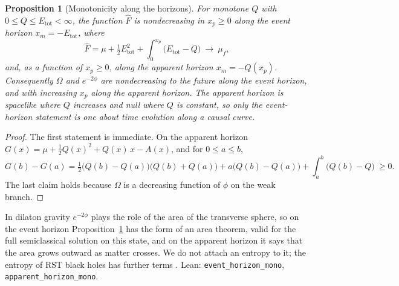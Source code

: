 \documentclass[11pt]{article}
\newtheorem{proposition}{Proposition}
\theoremstyle{remark}
\newcommand{\Etot}{E_{\mathrm{tot}}}
\newcommand{\Fh}{\widehat F}
\newcommand{\lean}[1]{\texttt{#1}}
\begin{document}
\begin{proposition}[Monotonicity along the horizons]\label{prop:mono}
For monotone $Q$ with $0\le Q\le\Etot<\infty$, the function $\Fh$ is nondecreasing in $x_p\ge0$ along the event horizon $x_m=-\Etot$, where
\[
\Fh=\mu+\tfrac12\Etot^2+\int_0^{x_p}\bigl(\Etot-Q\bigr)\ \longrightarrow\ \mu_f ,
\]
and, as a function of $x_p\ge0$, along the apparent horizon $x_m=-Q(x_p)$. Consequently $\Omega$ and $e^{-2\phi}$ are nondecreasing to the future along the event horizon, and with increasing $x_p$ along the apparent horizon. The apparent horizon is spacelike where $Q$ increases and null where $Q$ is constant, so only the event-horizon statement is one about time evolution along a causal curve.
\end{proposition}
\begin{proof}
The first statement is immediate. On the apparent horizon $G(x)=\mu+\tfrac12Q(x)^2+Q(x)\,x-A(x)$, and for $0\le a\le b$,
\[
G(b)-G(a)=\tfrac12\bigl(Q(b)-Q(a)\bigr)\bigl(Q(b)+Q(a)\bigr)+a\bigl(Q(b)-Q(a)\bigr)+\int_a^b\bigl(Q(b)-Q\bigr)\ \ge0 .
\]
The last claim holds because $\Omega$ is a decreasing function of $\phi$ on the weak branch.
\end{proof}

In dilaton gravity $e^{-2\phi}$ plays the role of the area of the transverse sphere, so on the event horizon Proposition~\ref{prop:mono} has the form of an area theorem, valid for the full semiclassical solution on this state, and on the apparent horizon it says that the area grows outward as matter crosses. We do not attach an entropy to it; the entropy of RST black holes has further terms \cite{FPST}. Lean: \lean{event\_horizon\_mono}, \lean{apparent\_horizon\_mono}.
\end{document}
